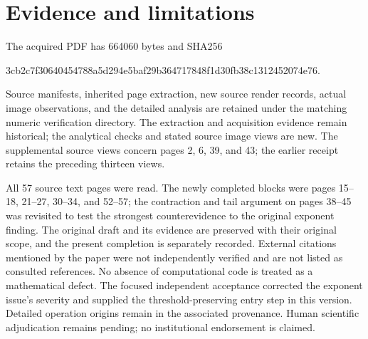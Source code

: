 \documentclass[10pt]{article}
\begin{document}
\section*{Evidence and limitations}
The acquired PDF has 664060 bytes and SHA256\par
3cb2c7f30640454788a5d294e5baf29b364717848f1d30fb38c1312452074e76.\par
Source manifests, inherited page extraction, new source render records, actual image observations, and the detailed analysis are retained under the matching numeric verification directory. The extraction and acquisition evidence remain historical; the analytical checks and stated source image views are new. The supplemental source views concern pages 2, 6, 39, and 43; the earlier receipt retains the preceding thirteen views.\par
All 57 source text pages were read. The newly completed blocks were pages 15–18, 21–27, 30–34, and 52–57; the contraction and tail argument on pages 38–45 was revisited to test the strongest counterevidence to the original exponent finding. The original draft and its evidence are preserved with their original scope, and the present completion is separately recorded. External citations mentioned by the paper were not independently verified and are not listed as consulted references. No absence of computational code is treated as a mathematical defect. The focused independent acceptance corrected the exponent issue’s severity and supplied the threshold-preserving entry step in this version. Detailed operation origins remain in the associated provenance. Human scientific adjudication remains pending; no institutional endorsement is claimed.\par
\end{document}
